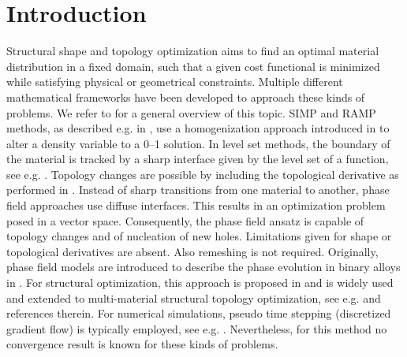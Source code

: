 \documentclass[a4paper,11pt]{article}
\theoremstyle{remark}
\begin{document}
\section{Introduction}
\label{sec:Intro}
Structural shape and topology optimization aims to find an optimal material distribution in a fixed domain, such that a given cost functional is minimized while satisfying physical or geometrical constraints. 
Multiple different mathematical frameworks have been developed to approach these kinds of problems.
We refer to \cite{SigmundReview} for a general overview of this topic.
SIMP and RAMP methods, as described e.g. in \cite{BenSig03,RAMP}, use a homogenization approach introduced in \cite{bendsoe1988HomogenizationApproach} to alter a density variable to a 0--1 solution. 
In level set methods, the boundary of the material is tracked by a sharp interface given by the level set of a function, see e.g. \cite{Burger2003LevelSet,Wang2003LevelSet}. 
Topology changes are possible by including the topological derivative as performed in \cite{AllaireTopologicalDeriv,Burger2004TopologicalDerivative}. 
Instead of sharp transitions from one material to another, phase field approaches use diffuse interfaces.
This results in an optimization problem posed in a vector space.
Consequently, the phase field ansatz is capable of topology changes and of nucleation of new holes.
Limitations given for shape or topological derivatives are absent.
Also remeshing is not required.
Originally, phase field models are introduced to describe the phase evolution in binary alloys in \cite{AllenCahn,CahnHilliard}. 
For structural optimization, this approach is proposed in \cite{BourdinChambolle} and is widely used and extended to multi-material structural topology optimization, see e.g. \cite{ABCHRR,BFGS14,BurgerStainko,Dede2012,Garcke4DPrinting,Takezawa2010,Wang2004PhaseField} and references therein.
For numerical simulations, pseudo time stepping (discretized gradient flow) is typically employed, see e.g. \cite{CHEN2026SemiImpl,WANG2026Uncert}.
Nevertheless, for this method no convergence result is known for these kinds of problems.
\end{document}
